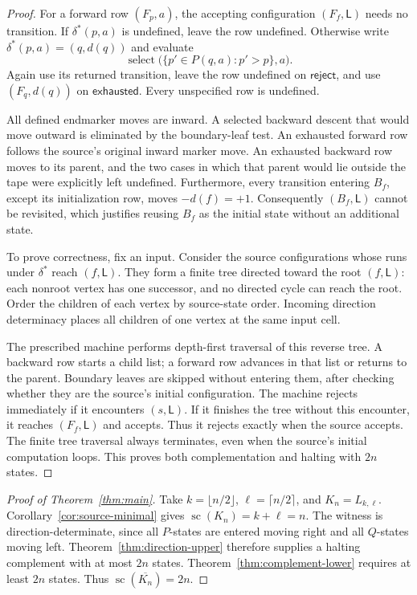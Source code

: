 \documentclass[11pt,a4paper]{article}
\theoremstyle{definition}
\theoremstyle{remark}
\newcommand{\LL}{\mathsf L}
\newcommand{\statecomplexity}{\operatorname{sc}}
\begin{document}
\begin{proof}
For a forward row $(F_p,a)$, the accepting configuration $(F_f,\LL)$
needs no transition. If $\delta^*(p,a)$ is undefined, leave the row undefined.
Otherwise write $\delta^*(p,a)=(q,d(q))$ and evaluate
\[
  \operatorname{select}\bigl(\{p'\in P(q,a):p'>p\},a\bigr).
\]
Again use its returned transition, leave the row undefined on
$\mathsf{reject}$, and use $(F_q,d(q))$ on $\mathsf{exhausted}$.
Every unspecified row is undefined.

All defined endmarker moves are inward. A selected backward descent that
would move outward is eliminated by the boundary-leaf test. An exhausted
forward row follows the source's original inward marker move. An exhausted
backward row moves to its parent, and the two cases in which that parent
would lie outside the tape were explicitly left undefined. Furthermore,
every transition entering $B_f$, except its initialization row, moves
$-d(f)=+1$. Consequently $(B_f,\LL)$ cannot be revisited, which justifies
reusing $B_f$ as the initial state without an additional state.

To prove correctness, fix an input. Consider the source configurations whose
runs under $\delta^*$ reach $(f,\LL)$. They form a finite tree directed
toward the root $(f,\LL)$: each nonroot vertex has one successor, and no
directed cycle can reach the root. Order the children of each vertex by
source-state order. Incoming direction determinacy places all children of
one vertex at the same input cell.

The prescribed machine performs depth-first traversal of this reverse tree.
A backward row starts a child list; a forward row advances in that list or
returns to the parent. Boundary leaves are skipped without entering them,
after checking whether they are the source's initial configuration. The
machine rejects immediately if it encounters $(s,\LL)$. If it finishes
the tree without this encounter, it reaches $(F_f,\LL)$ and accepts.
Thus it rejects exactly when the source accepts. The finite tree traversal
always terminates, even when the source's initial computation loops. This
proves both complementation and halting with $2n$ states.
\end{proof}

\begin{proof}[Proof of Theorem~\ref{thm:main}]
Take $k=\lfloor n/2\rfloor$, $\ell=\lceil n/2\rceil$, and
$K_n=L_{k,\ell}$. Corollary~\ref{cor:source-minimal} gives
$\statecomplexity(K_n)=k+\ell=n$. The witness is direction-determinate,
since all $P$-states are entered moving right and all $Q$-states
moving left. Theorem~\ref{thm:direction-upper} therefore supplies
a halting complement with at most $2n$ states.
Theorem~\ref{thm:complement-lower} requires at least $2n$ states.
Thus $\statecomplexity(\overline{K_n})=2n$.
\end{proof}
\end{document}
